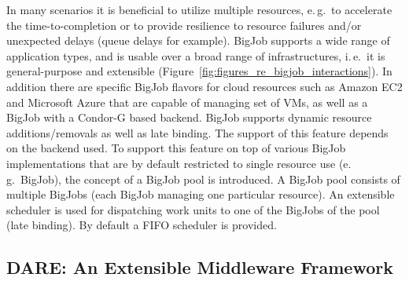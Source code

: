 \documentclass[]{svjour3}
\begin{document}
In many scenarios it is beneficial to utilize multiple resources,
e.\,g.\ to accelerate the time-to-completion or to provide resilience
to resource failures and/or unexpected delays (queue delays for
example).  BigJob supports a wide range of application types, and is
usable over a broad range of infrastructures, i.\,e.\ it is
general-purpose and extensible
(Figure~\ref{fig:figures_re_bigjob_interactions}). In addition there
are specific BigJob flavors for cloud resources such as Amazon EC2 and
Microsoft Azure that are capable of managing set of VMs, as well as a
BigJob with a Condor-G based backend.  BigJob supports dynamic resource
additions/removals as well as late binding. The support of this
feature depends on the backend used. To support this feature on top of
various BigJob implementations that are by default restricted to
single resource use (e.\,g.\ BigJob), the concept of a BigJob pool is
introduced. A BigJob pool consists of multiple BigJobs (each BigJob
managing one particular resource). An extensible scheduler is used for
dispatching work units to one of the BigJobs of the pool (late
binding). By default a FIFO scheduler is provided.





\subsection{DARE: An Extensible Middleware Framework}


\end{document}

